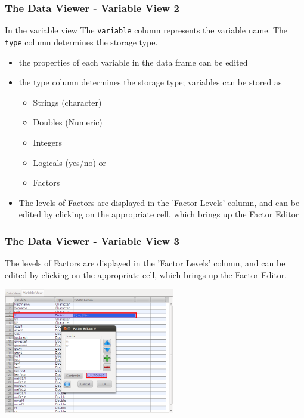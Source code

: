 \documentclass[xcolor={table}]{beamer}
\begin{document}
\begin{frame}\frametitle{The Data Viewer - Variable View 2}
  In the variable view  The \texttt{variable} column represents the variable name. The \texttt{type} column determines the storage type.  
  \begin{itemize}
  \item the properties of each variable in the data frame can be edited
  \item the type column determines the storage type; variables can be stored as 
    \begin{itemize}
    \item Strings (character)
    \item Doubles (Numeric)
    \item Integers
    \item Logicals (yes/no) or 
    \item Factors
    \end{itemize}
  \item The levels of Factors are displayed in the 'Factor Levels' column, and can be edited by clicking on the appropriate cell, which brings up the Factor Editor
  \end{itemize}
\end{frame}

\begin{frame}\frametitle{The Data Viewer - Variable View 3}
The levels of Factors are displayed in the 'Factor Levels' column, and can be edited by clicking on the appropriate cell, which brings up the Factor Editor. 
\begin{center}
   \includegraphics[height=5.5cm]{dataviewer5.png}
\end{center}
\end{frame}
\end{document}
